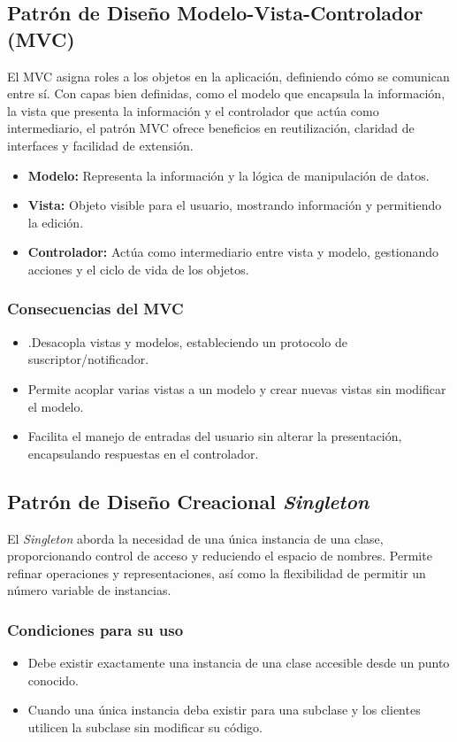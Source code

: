 \documentclass[11pt, twocolumn]{article}
\begin{document}
  \subsection*{Patrón de Diseño Modelo-Vista-Controlador (MVC)}
  El MVC asigna roles a los objetos en la aplicación, definiendo cómo se comunican entre sí. Con capas bien definidas, como el modelo que encapsula la información, la vista que presenta la información y el controlador que actúa como intermediario, el patrón MVC ofrece beneficios en reutilización, claridad de interfaces y facilidad de extensión.

  \begin{itemize}
    \item \textbf{Modelo:} Representa la información y la lógica de manipulación de datos.
    \item \textbf{Vista:} Objeto visible para el usuario, mostrando información y permitiendo la edición.
    \item \textbf{Controlador:} Actúa como intermediario entre vista y modelo, gestionando acciones y el ciclo de vida de los objetos.
  \end{itemize}

  \subsubsection*{Consecuencias del MVC}
  \begin{itemize}
    \item .Desacopla vistas y modelos, estableciendo un protocolo de suscriptor/notificador.
    \item Permite acoplar varias vistas a un modelo y crear nuevas vistas sin modificar el modelo.
    \item Facilita el manejo de entradas del usuario sin alterar la presentación, encapsulando respuestas en el controlador.
  \end{itemize}

  \subsection*{Patrón de Diseño Creacional \textit{Singleton}}
  El \textit{Singleton} aborda la necesidad de una única instancia de una clase, proporcionando control de acceso y reduciendo el espacio de nombres. Permite refinar operaciones y representaciones, así como la flexibilidad de permitir un número variable de instancias.
  
  \subsubsection*{Condiciones para su uso}
  \begin{itemize}
    \item Debe existir exactamente una instancia de una clase accesible desde un punto conocido.
    \item Cuando una única instancia deba existir para una subclase y los clientes utilicen la subclase sin modificar su código.
  \end{itemize}
\end{document}
